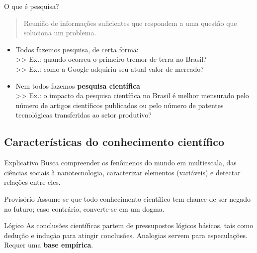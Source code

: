 \begin{frame}{O que é pesquisa?}
\begin{quotation}
Reunião de informações suficientes que respondem a uma questão que soluciona um problema. 
\end{quotation}
\begin{itemize}
\item Todos fazemos pesquisa, de certa forma: \\
>> Ex.: quando ocorreu o primeiro tremor de terra no Brasil? \\
>> Ex.: como a Google adquiriu seu atual valor de mercado?
\item Nem todos fazemos \textbf{pesquisa científica} \\
>> Ex.: o impacto da pesquisa científica no Brasil é melhor mensurado pelo número de artigos científicos publicados ou pelo número de patentes tecnológicas transferidas ao setor produtivo?
\end{itemize}
\end{frame}

\subsection*{Características do conhecimento científico}

\begin{frame}
\begin{block}{Explicativo}
Busca compreender os fenômenos do mundo em multiescala, das ciências sociais à nanotecnologia, caracterizar elementos (variáveis) e detectar relações entre eles.
\end{block}
\end{frame}

\begin{frame}
\begin{block}{Provisório}
Assume-se que todo conhecimento científico tem chance de ser negado no futuro; caso contrário, converte-se em um dogma.
\end{block}
\end{frame}

\begin{frame}
\begin{block}{Lógico}
As conclusões científicas partem de pressupostos lógicos básicos, tais como dedução e indução para atingir conclusões. Analogias servem para especulações. Requer uma \textbf{base empírica}.
\end{block}
\end{frame}

